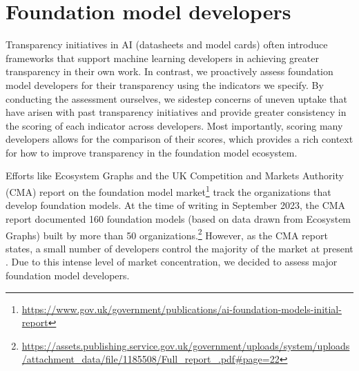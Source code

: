 \hypertarget{developers}{\section{Foundation model developers}}
\label{sec:developers}




\noindent Transparency initiatives in AI (\eg datasheets and model cards) often introduce frameworks that support machine learning developers in achieving greater transparency in their own work.
In contrast, we proactively assess foundation model developers for their transparency using the \numindicators indicators we specify.
By conducting the assessment ourselves, we sidestep concerns of uneven uptake that have arisen with past transparency initiatives \citep[\eg][]{gebru2018datasheets, mitchell2018modelcards} and provide greater consistency in the scoring of each indicator across developers.
Most importantly, scoring many developers allows for the comparison of their scores, which provides a rich context for how to improve transparency in the foundation model ecosystem.



Efforts like Ecosystem Graphs \citep{bommasani2023ecosystem} and the UK Competition and Markets Authority (CMA) report on the foundation model market\footnote{\url{https://www.gov.uk/government/publications/ai-foundation-models-initial-report}} track the organizations that develop foundation models.
At the time of writing in September 2023, the CMA report documented 160 foundation models (based on data drawn from Ecosystem Graphs) built by more than 50 organizations.\footnote{\url{https://assets.publishing.service.gov.uk/government/uploads/system/uploads/attachment_data/file/1185508/Full_report\_.pdf\#page=22}} 
However, as the CMA report states, a small number of developers control the majority of the market at present \citep{vipra2023concentration}.
Due to this intense level of market concentration, we decided to assess \numcompanies major foundation model developers.\clearpage

